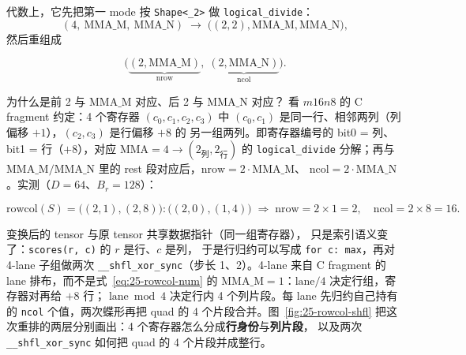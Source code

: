 

代数上，它先把第一 mode 按 \texttt{Shape<\_2>} 做
\texttt{logical\_\allowbreak{}divide}：
\[
  (4,\ \mathrm{MMA\_M},\ \mathrm{MMA\_N})
  \;\longrightarrow\;
  \bigl((2,2),\mathrm{MMA\_M},\mathrm{MMA\_N}\bigr),
\]
然后重组成

\begin{equation}
  \bigl(\underbrace{(2,\mathrm{MMA\_M})}_{\text{nrow}},\;
  \underbrace{(2,\mathrm{MMA\_N})}_{\text{ncol}}\bigr).
  \label{eq:25-rowcol}
\end{equation}

为什么是前 2 与 $\mathrm{MMA\_M}$ 对应、后 2 与 $\mathrm{MMA\_N}$ 对应？
看 $m16n8$ 的 C fragment 约定：4 个寄存器 $(c_0,c_1,c_2,c_3)$ 中
$(c_0,c_1)$ 是同一行、相邻两列（列偏移 $+1$），$(c_2,c_3)$ 是行偏移 $+8$ 的
另一组两列。即寄存器编号的 bit0 = 列、bit1 = 行（$+8$），对应
$\mathrm{MMA}=4 \to (2_{\text{列}},2_{\text{行}})$ 的
\texttt{logical\_\allowbreak{}divide} 分解；再与 $\mathrm{MMA\_M}/\mathrm{MMA\_N}$
里的 rest 段对应后，$\mathrm{nrow}=2\cdot \mathrm{MMA\_M}$、
$\mathrm{ncol}=2\cdot \mathrm{MMA\_N}$。实测（$D{=}64$、$B_r{=}128$）：

\begin{equation}
  \mathrm{rowcol}(S) = \bigl((2,1),(2,8)\bigr):\bigl((2,0),(1,4)\bigr)
  \;\Rightarrow\; \mathrm{nrow}=2\times1=2,\quad \mathrm{ncol}=2\times8=16 .
  \label{eq:25-rowcol-num}
\end{equation}

变换后的 tensor 与原 tensor 共享数据指针（同一组寄存器），
只是索引语义变了：\texttt{scores(r, c)} 的 $r$ 是行、$c$ 是列，
于是行归约可以写成 \texttt{for c: max}，再对 4-lane 子组做两次
\texttt{\_\allowbreak{}\_\allowbreak{}shfl\_\allowbreak{}xor\_\allowbreak{}sync}（步长 1、2）。4-lane 来自
C fragment 的 lane 排布，而不是式~\eqref{eq:25-rowcol-num} 的
$\mathrm{MMA\_M}=1$：$\mathrm{lane}/4$ 决定行组，寄存器对再给 $+8$ 行；
$\mathrm{lane}\bmod4$ 决定行内 4 个列片段。每 lane 先归约自己持有的
\texttt{ncol} 个值，两次蝶形再把 quad 的 4 个片段合并。图~\ref{fig:25-rowcol-shfl}
把这次重排的两层分别画出：4 个寄存器怎么分成\textbf{行身份}与\textbf{列片段}，
以及两次 \texttt{\_\allowbreak{}\_\allowbreak{}shfl\_\allowbreak{}xor\_\allowbreak{}sync} 如何把 quad 的 4 个片段并成整行。

